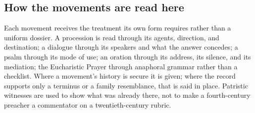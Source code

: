 \subsection*{How the movements are read here}

Each movement receives the treatment its own form requires rather than a uniform dossier. A
procession is read through its agents, direction, and destination; a dialogue through its
speakers and what the answer concedes; a psalm through its mode of use; an oration through its
address, its silence, and its mediation; the Eucharistic Prayer through anaphoral grammar
rather than a checklist. Where a movement's history is secure it is given; where the record
supports only a terminus or a family resemblance, that is said in place. Patristic witnesses
are used to show what was already there, not to make a fourth-century preacher a commentator on
a twentieth-century rubric.
